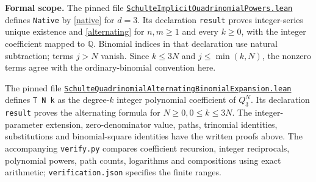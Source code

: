 \documentclass[11pt]{article}
\begin{document}
\noindent\textbf{Formal scope.}
The pinned file
\href{https://github.com/the-omega-institute/trureturing/blob/2f8421f6b90d37b4815b887f6c60987553831b20/D5/S3/Combinatorics/PowerSeries/SchulteImplicitQuadrinomialPowers.lean}{\texttt{SchulteImplicitQuadrinomialPowers.lean}}
defines \texttt{Native} by \eqref{native} for $d=3$.
Its declaration \texttt{result} proves integer-series unique existence
and \eqref{alternating} for $n,m\geq1$ and every $k\geq0$, with the
integer coefficient mapped to $\mathbb Q$. Binomial indices in that
declaration use natural subtraction; terms $j>N$ vanish. Since
$k\leq3N$ and $j\leq\min(k,N)$, the nonzero terms agree with the
ordinary-binomial convention here.

The pinned file
\href{https://github.com/the-omega-institute/trureturing/blob/2f8421f6b90d37b4815b887f6c60987553831b20/D5/S1/Recurrence/SchulteQuadrinomialAlternatingBinomialExpansion.lean}{\texttt{SchulteQuadrinomialAlternatingBinomialExpansion.lean}}
defines \texttt{T N k} as the degree-$k$ integer polynomial coefficient
of $Q_3^N$. Its declaration \texttt{result} proves the alternating
formula for $N\geq0,0\leq k\leq3N$.
The integer-parameter extension, zero-denominator value, paths,
trinomial identities, substitutions and binomial-square identities have
the written proofs above. The accompanying \texttt{verify.py} compares
coefficient recursion, integer reciprocals, polynomial powers, path
counts, logarithms and compositions using exact arithmetic;
\texttt{verification.json} specifies the finite ranges.
\end{document}
